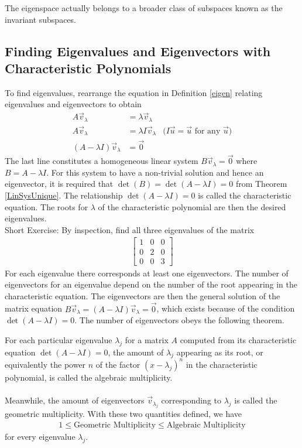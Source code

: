 The eigenspace actually belongs to a broader class of subspaces known as the invariant subspaces.

\subsection{Finding Eigenvalues and Eigenvectors with Characteristic Polynomials}

To find eigenvalues, rearrange the equation in Definition \ref{eigen} relating eigenvalues and eigenvectors to obtain
\begin{align*}
A\vec{v}_\lambda &= \lambda\vec{v}_\lambda \\
A\vec{v}_\lambda &= \lambda I\vec{v}_\lambda  &\text{($I\vec{u} = \vec{u}$ for any $\vec{u}$)} \\
(A-\lambda I)\vec{v}_\lambda &= \vec{0}
\end{align*}
The last line constitutes a homogeneous linear system $B\vec{v}_\lambda = \vec{0}$ where $B = A - \lambda I$. For this system to have a non-trivial solution and hence an eigenvector, it is required that $\det(B) = \det(A - \lambda I) = 0$ from Theorem \ref{LinSysUnique}. The relationship $\det(A - \lambda I) = 0$ is called the characteristic equation. The roots for $\lambda$ of the characteristic polynomial are then the desired eigenvalues. \\
Short Exercise: By inspection, find all three eigenvalues of the matrix
\begin{align*}
\begin{bmatrix}
1 & 0 & 0 \\
0 & 2 & 0 \\
0 & 0 & 3
\end{bmatrix}
\end{align*}
For each eigenvalue there corresponds at least one eigenvectors. The number of eigenvectors for an eigenvalue depend on the number of the root appearing in the characteristic equation. The eigenvectors are then the general solution of the matrix equation $B\vec{v}_\lambda = (A - \lambda I)\vec{v}_\lambda = \vec{0}$, which exists because of the condition $\det(A - \lambda I) = 0$. The number of eigenvectors obeys the following theorem.
\begin{thm}
For each particular eigenvalue $\lambda_j$ for a matrix $A$ computed from its characteristic equation $\det(A - \lambda I) = 0$, the amount of $\lambda_j$ appearing as its root, or equivalently the power $n$ of the factor $(x-\lambda_j)^n$ in the characteristic polynomial, is called the algebraic multiplicity. \\
\\
Meanwhile, the amount of eigenvectors $\vec{v}_{\lambda_j}$ corresponding to $\lambda_j$ is called the geometric multiplicity. With these two quantities defined, we have
\begin{align*}
1 \leq \text{Geometric Multiplicity} \leq \text{Algebraic Multiplicity}
\end{align*}
for every eigenvalue $\lambda_j$.
\end{thm}

